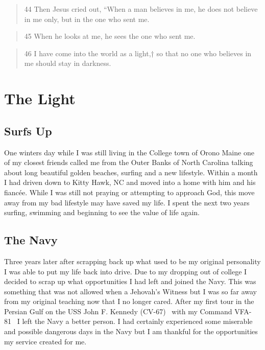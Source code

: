 \documentclass[11pt,a4paper]{scrartcl} %
\begin{document}
\begin{verse}
44 Then Jesus cried out, “When a man believes in me, he does not believe in me only, but in the one who sent me.
\end{verse}
\begin{verse}
45 When he looks at me, he sees the one who sent me.
\end{verse}
\begin{verse}
 46 I have come into the world as a light,† so that no one who believes in me should stay in darkness. 
\end{verse}
\section{The Light}
\begin{doublespace}
\subsection{Surfs Up}
One winters day while I was still living in the College town of Orono Maine one of my closest friends called me from the Outer Banks of North Carolina talking about long beautiful golden beaches, surfing and a new lifestyle. Within a month I had driven down to Kitty Hawk, NC and moved into a home with him and his fiancée. While I was still not praying or attempting to approach God, this move away from my bad lifestyle may have saved my life. I spent the next two years surfing, swimming and beginning to see the value of life again. 
\subsection{The Navy}
Three years later after scrapping back up what used to be my original personality I was able to put my life back into drive. Due to my dropping out of college I decided to scrap up what opportunities I had left and joined the Navy. This was something that was not allowed when a Jehovah's Witness but I was so far away from my original teaching now that I no longer cared. After my first tour in the Persian Gulf on the USS John F. Kennedy (CV-67)~\cite{wiki:006} with my Command VFA-81~\cite{wiki:007} I left the Navy a better person. I had certainly experienced some miserable and possible dangerous days in the Navy but I am thankful for the opportunities my service created for me. 
\end{doublespace}
\begin{center}
\textcolor{Maroon}{}\\
\textcolor{brown}{}\\
\end{center}
\end{document}
